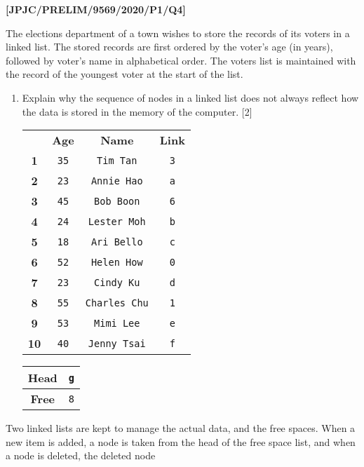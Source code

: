 \item \textbf{{[}JPJC/PRELIM/9569/2020/P1/Q4{]} }

The elections department of a town wishes to store the records of
its voters in a linked list. The stored records are first ordered
by the voter\textquoteright s age (in years), followed by voter\textquoteright s
name in alphabetical order. The voters list is maintained with the
record of the youngest voter at the start of the list. 
\begin{enumerate}
\item Explain why the sequence of nodes in a linked list does not always
reflect how the data is stored in the memory of the computer. {[}2{]}
\quad{} 

\begin{tabular}{c|c|c|c|}
\multicolumn{1}{c}{} & \multicolumn{1}{c}{\textbf{Age}} & \multicolumn{1}{c}{\textbf{Name}} & \multicolumn{1}{c}{\textbf{Link}}\tabularnewline
\cline{2-4} \cline{3-4} \cline{4-4} 
\textbf{1} & \texttt{35} & \texttt{Tim Tan} & \texttt{3}\tabularnewline
\cline{2-4} \cline{3-4} \cline{4-4} 
\textbf{2} & \texttt{23} & \texttt{Annie Hao} & \texttt{a}\tabularnewline
\cline{2-4} \cline{3-4} \cline{4-4} 
\textbf{3} & \texttt{45} & \texttt{Bob Boon} & \texttt{6}\tabularnewline
\cline{2-4} \cline{3-4} \cline{4-4} 
\textbf{4} & \texttt{24} & \texttt{Lester Moh} & \texttt{b}\tabularnewline
\cline{2-4} \cline{3-4} \cline{4-4} 
\textbf{5} & \texttt{18} & \texttt{Ari Bello} & \texttt{c}\tabularnewline
\cline{2-4} \cline{3-4} \cline{4-4} 
\textbf{6} & \texttt{52} & \texttt{Helen How} & \texttt{0}\tabularnewline
\cline{2-4} \cline{3-4} \cline{4-4} 
\textbf{7} & \texttt{23} & \texttt{Cindy Ku} & \texttt{d}\tabularnewline
\cline{2-4} \cline{3-4} \cline{4-4} 
\textbf{8} & \texttt{55} & \texttt{Charles Chu} & \texttt{1}\tabularnewline
\cline{2-4} \cline{3-4} \cline{4-4} 
\textbf{9} & \texttt{53} & \texttt{Mimi Lee} & \texttt{e}\tabularnewline
\cline{2-4} \cline{3-4} \cline{4-4} 
\textbf{10} & \texttt{40} & \texttt{Jenny Tsai} & \texttt{f}\tabularnewline
\cline{2-4} \cline{3-4} \cline{4-4} 
\end{tabular}%
\begin{tabular}{|c|c|}
\hline 
\textbf{Head} & \texttt{g}\tabularnewline
\hline 
\textbf{Free} & \texttt{8}\tabularnewline
\hline 
\end{tabular}
\end{enumerate}
Two linked lists are kept to manage the actual data, and the free
spaces. When a new item is added, a node is taken from the head of
the free space list, and when a node is deleted, the deleted node
